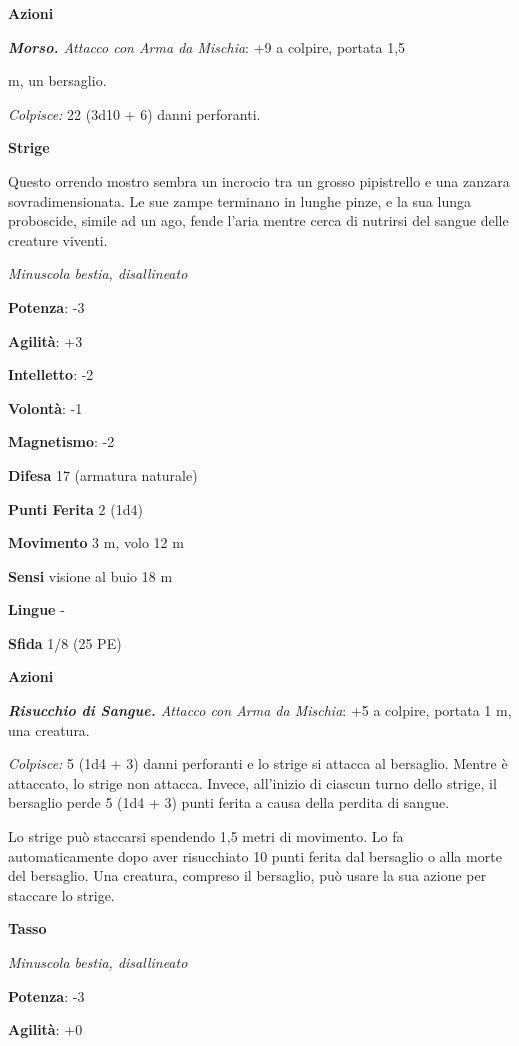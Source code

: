\begin{multicols}{2}
\smallskip\textbf{Azioni}

\emph{\textbf{Morso.} Attacco con Arma da Mischia}: +9 a colpire,
portata 1,5

m, un bersaglio.

\emph{Colpisce:} 22 (3d10 + 6) danni perforanti.



\textbf{Strige}

Questo orrendo mostro sembra un incrocio tra un grosso pipistrello e una
zanzara sovradimensionata. Le sue zampe terminano in lunghe pinze, e la
sua lunga proboscide, simile ad un ago, fende l'aria mentre cerca di
nutrirsi del sangue delle creature viventi.

\emph{Minuscola bestia, disallineato}

\textbf{Potenza}: -3

\textbf{Agilità}: +3

\textbf{Intelletto}: -2

\textbf{Volontà}: -1

\textbf{Magnetismo}: -2

\textbf{Difesa} 17 (armatura naturale)

\textbf{Punti Ferita} 2 (1d4)

\textbf{Movimento} 3 m, volo 12 m

\textbf{Sensi} visione al buio 18 m

\textbf{Lingue} -

\textbf{Sfida} 1/8 (25 PE)\smallskip

\smallskip\textbf{Azioni}

\emph{\textbf{Risucchio di Sangue.} Attacco con Arma da Mischia}: +5 a
colpire, portata 1 m, una creatura.

\emph{Colpisce:} 5 (1d4 + 3) danni perforanti e lo strige si attacca al
bersaglio. Mentre è attaccato, lo strige non attacca. Invece, all'inizio
di ciascun turno dello strige, il bersaglio perde 5 (1d4 + 3) punti
ferita a causa della perdita di sangue.

Lo strige può staccarsi spendendo 1,5 metri di movimento. Lo fa
automaticamente dopo aver risucchiato 10 punti ferita dal bersaglio o
alla morte del bersaglio. Una creatura, compreso il bersaglio, può usare
la sua azione per staccare lo strige.

\textbf{Tasso}

\emph{Minuscola bestia, disallineato}

\textbf{Potenza}: -3

\textbf{Agilità}: +0


\end{multicols}
